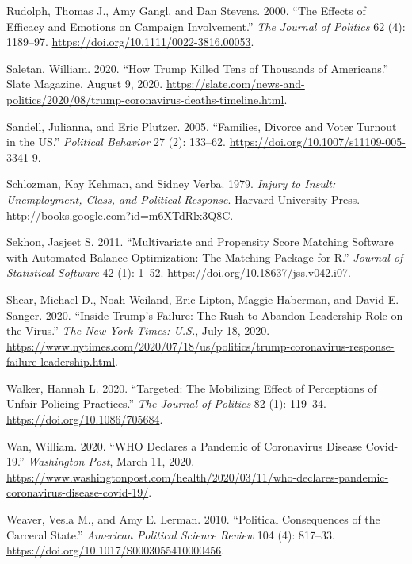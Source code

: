 \documentclass[
  12pt,
]{article}
\newlength{\cslhangindent}
\newenvironment{cslreferences}%
  {\setlength{\parindent}{0pt}%
  \everypar{\setlength{\hangindent}{\cslhangindent}}\ignorespaces}%
  {\par}
\begin{document}
\begin{cslreferences}
\leavevmode\hypertarget{ref-Rudolph2000}{}%
Rudolph, Thomas J., Amy Gangl, and Dan Stevens. 2000. ``The Effects of Efficacy and Emotions on Campaign Involvement.'' \emph{The Journal of Politics} 62 (4): 1189--97. \url{https://doi.org/10.1111/0022-3816.00053}.

\leavevmode\hypertarget{ref-Saletan2020}{}%
Saletan, William. 2020. ``How Trump Killed Tens of Thousands of Americans.'' Slate Magazine. August 9, 2020. \url{https://slate.com/news-and-politics/2020/08/trump-coronavirus-deaths-timeline.html}.

\leavevmode\hypertarget{ref-Sandell2005}{}%
Sandell, Julianna, and Eric Plutzer. 2005. ``Families, Divorce and Voter Turnout in the US.'' \emph{Political Behavior} 27 (2): 133--62. \url{https://doi.org/10.1007/s11109-005-3341-9}.

\leavevmode\hypertarget{ref-Schlozman1979}{}%
Schlozman, Kay Kehman, and Sidney Verba. 1979. \emph{Injury to Insult: Unemployment, Class, and Political Response}. Harvard University Press. \url{http://books.google.com?id=m6XTdRlx3Q8C}.

\leavevmode\hypertarget{ref-Sekhon2011}{}%
Sekhon, Jasjeet S. 2011. ``Multivariate and Propensity Score Matching Software with Automated Balance Optimization: The Matching Package for R.'' \emph{Journal of Statistical Software} 42 (1): 1--52. \url{https://doi.org/10.18637/jss.v042.i07}.

\leavevmode\hypertarget{ref-Shear2020}{}%
Shear, Michael D., Noah Weiland, Eric Lipton, Maggie Haberman, and David E. Sanger. 2020. ``Inside Trump's Failure: The Rush to Abandon Leadership Role on the Virus.'' \emph{The New York Times: U.S.}, July 18, 2020. \url{https://www.nytimes.com/2020/07/18/us/politics/trump-coronavirus-response-failure-leadership.html}.

\leavevmode\hypertarget{ref-Walker2020}{}%
Walker, Hannah L. 2020. ``Targeted: The Mobilizing Effect of Perceptions of Unfair Policing Practices.'' \emph{The Journal of Politics} 82 (1): 119--34. \url{https://doi.org/10.1086/705684}.

\leavevmode\hypertarget{ref-Wan2020}{}%
Wan, William. 2020. ``WHO Declares a Pandemic of Coronavirus Disease Covid-19.'' \emph{Washington Post}, March 11, 2020. \url{https://www.washingtonpost.com/health/2020/03/11/who-declares-pandemic-coronavirus-disease-covid-19/}.

\leavevmode\hypertarget{ref-Weaver2010}{}%
Weaver, Vesla M., and Amy E. Lerman. 2010. ``Political Consequences of the Carceral State.'' \emph{American Political Science Review} 104 (4): 817--33. \url{https://doi.org/10.1017/S0003055410000456}.


\end{cslreferences}
\end{document}
